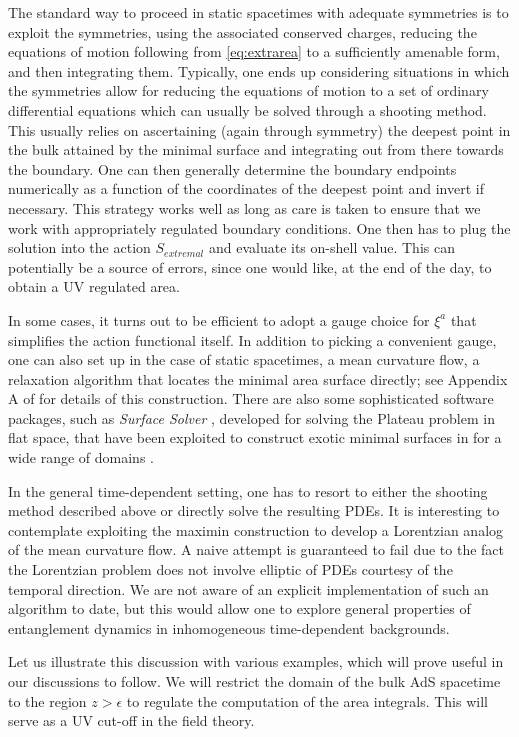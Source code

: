 \documentclass[12pt,openany]{book}
\begin{document}
The standard way to proceed in static spacetimes with adequate symmetries is to exploit the symmetries, using the associated conserved charges, reducing the equations of motion following from \eqref{eq:extrarea} to a sufficiently amenable form, and then integrating them. Typically, one ends up considering situations in which the symmetries allow for reducing the equations of motion to a set of ordinary differential equations which can  usually be solved through a shooting method. This usually relies on ascertaining (again through symmetry) the deepest point in the bulk attained by the minimal surface and integrating out from there towards the boundary. One can then generally determine the boundary endpoints numerically as a function of the coordinates of the deepest  point and invert if necessary. This strategy works well as long as care is taken to ensure that we work with appropriately regulated boundary conditions. One then has to plug the solution into the action $S_{extremal}$ and evaluate its on-shell value. This can potentially be a source of errors, since one would like,  at the end of the day, to obtain a UV regulated area.

In some cases, it turns out to be efficient to adopt a gauge choice for $\xi^a$ that simplifies the action functional itself. In addition to picking a convenient gauge, one can also set up in the case of static spacetimes, a mean curvature flow, a relaxation algorithm that locates the minimal area surface directly; see Appendix A of \cite{Hubeny:2013gta} for details of this construction. There are also some sophisticated software packages, such as\emph{ Surface Solver} \cite{Brakke:1992aa}, developed for solving the Plateau problem in flat space, that  have been exploited to construct exotic minimal surfaces in  for a wide range of domains \cite{Fonda:2014cca,Fonda:2015nma}.

In the general time-dependent setting, one has to resort to either the shooting method described above or directly solve the resulting PDEs. It is interesting to contemplate exploiting the maximin construction to develop a Lorentzian analog of the mean curvature flow. A  naive attempt is guaranteed to fail due to the fact the Lorentzian problem does not involve elliptic  of PDEs courtesy of the temporal direction. We are not aware of an explicit implementation of such an algorithm to date, but this would  allow one to explore general properties of entanglement dynamics in inhomogeneous time-dependent backgrounds.

Let us illustrate this discussion with various examples, which will prove useful in our discussions to follow. We will restrict the domain of the bulk AdS spacetime to the region $z > \epsilon$ to regulate the computation of the area integrals. This will serve as a UV cut-off in the field theory.
\end{document}
